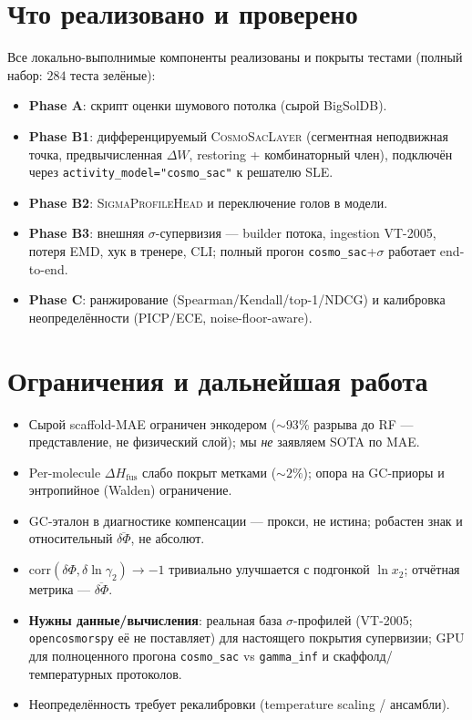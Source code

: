 \documentclass[11pt]{article}
\theoremstyle{plain}
\theoremstyle{definition}
\newcommand{\lnx}{\ln x_2}
\newcommand{\dHfus}{\Delta H_{\mathrm{fus}}}
\newcommand{\lng}{\ln\gamma_2}
\begin{document}
\section{Что реализовано и проверено}
Все локально-выполнимые компоненты реализованы и покрыты тестами (полный набор:
$284$ теста зелёные):
\begin{itemize}
\item \textbf{Phase A}: скрипт оценки шумового потолка (сырой BigSolDB).
\item \textbf{Phase B1}: дифференцируемый \textsc{CosmoSacLayer} (сегментная
  неподвижная точка, предвычисленная $\Delta W$, restoring + комбинаторный член),
  подключён через \texttt{activity\_model="cosmo\_sac"} к решателю SLE.
\item \textbf{Phase B2}: \textsc{SigmaProfileHead} и переключение голов в модели.
\item \textbf{Phase B3}: внешняя $\sigma$-супервизия --- builder потока, ingestion
  VT-2005, потеря EMD, хук в тренере, CLI; полный прогон \texttt{cosmo\_sac}+$\sigma$
  работает end-to-end.
\item \textbf{Phase C}: ранжирование (Spearman/Kendall/top-1/NDCG) и калибровка
  неопределённости (PICP/ECE, noise-floor-aware).
\end{itemize}

\section{Ограничения и дальнейшая работа}
\begin{itemize}
\item Сырой scaffold-MAE ограничен энкодером ($\sim\!93\%$ разрыва до RF ---
  представление, не физический слой); мы \emph{не} заявляем SOTA по MAE.
\item Per-molecule $\dHfus$ слабо покрыт метками ($\sim\!2\%$); опора на GC-приоры
  и энтропийное (Walden) ограничение.
\item GC-эталон в диагностике компенсации --- прокси, не истина; робастен знак и
  относительный $\overline{\delta\Phi}$, не абсолют.
\item $\mathrm{corr}(\delta\Phi,\delta\lng)\to-1$ тривиально улучшается с
  подгонкой $\lnx$; отчётная метрика --- $\overline{\delta\Phi}$.
\item \textbf{Нужны данные/вычисления}: реальная база $\sigma$-профилей (VT-2005;
  \texttt{opencosmorspy} её не поставляет) для настоящего покрытия супервизии;
  GPU для полноценного прогона \texttt{cosmo\_sac} vs \texttt{gamma\_inf} и
  скаффолд/температурных протоколов.
\item Неопределённость требует рекалибровки (temperature scaling / ансамбли).
\end{itemize}
\end{document}
